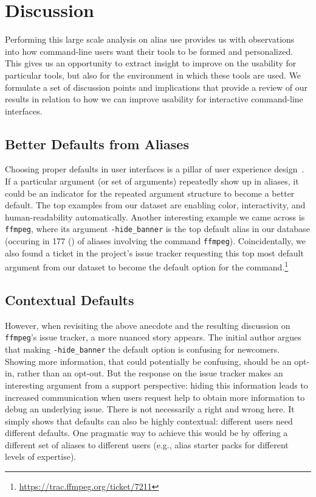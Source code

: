 \section{Discussion}

Performing this large scale analysis on alias use provides us with observations into how command-line users want their tools to be formed and personalized.
This gives us an opportunity to extract insight to improve on the usability for particular tools, but also for the environment in which these tools are used.
We formulate a set of discussion points and implications that provide a review of our results in relation to how we can improve usability for interactive command-line interfaces.

\subsection{Better Defaults from Aliases}

Choosing proper defaults in user interfaces is a pillar of user experience design~\cite{nielsen2005power}. 
If a particular argument (or set of arguments) repeatedly show up in aliases, it could be an indicator for the repeated argument structure to become a better default. 
The top examples from our dataset are enabling color, interactivity, and human-readability automatically.
Another interesting example we came across is \verb|ffmpeg|, where its argument \verb|-hide_banner| is the top default alias in our database (occuring in \num{177} () of aliases involving the command \verb|ffmpeg|).
Coincidentally, we also found a ticket in the project's issue tracker requesting this top most default argument from our dataset to become the default option for the command.\footnote{\url{https://trac.ffmpeg.org/ticket/7211}}

\subsection{Contextual Defaults}

However, when revisiting the above anecdote and the resulting discussion on \verb|ffmpeg|'s issue tracker, a more nuanced story appears.
The initial author argues that making \verb|-hide_banner| the default option is confusing for newcomers.
Showing more information, that could potentially be confusing, should be an opt-in, rather than an opt-out.
But the response on the issue tracker makes an interesting argument from a support perspective: hiding this information leads to increased communication when users request help to obtain more information to debug an underlying issue.
There is not necessarily a right and wrong here.
It simply shows that defaults can also be highly contextual: different users need different defaults.
One pragmatic way to achieve this would be by offering a different set of aliases to different users (e.g., alias starter packs for different levels of expertise).

